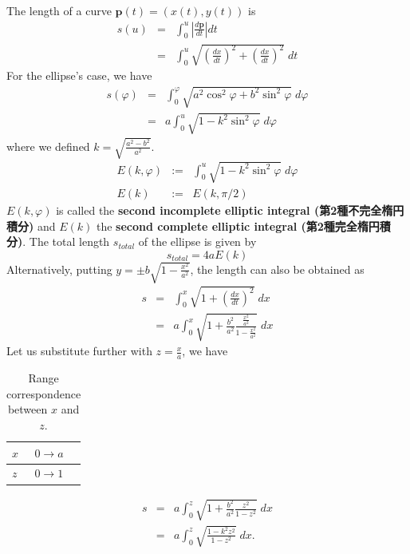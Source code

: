 \documentclass{article}
\begin{document}
The length of a curve $\mathbf{p}(t) = (x(t), y(t))$ is
\begin{eqnarray}
s(u) &=& \int_{0}^{u} \left| \frac{d \mathbf{p}}{d t} \right| dt  \\ \nonumber
     &=& \int_{0}^{u} \sqrt{ \left( \frac{d x}{d t} \right)^{2} +  \left( \frac{d x}{d t} \right)^{2} } \; dt
\end{eqnarray}
For the ellipse's case, we have
\begin{eqnarray}
s(\varphi) &=& \int_{0}^{\varphi} \sqrt{ a^{2} \cos^{2}{\varphi} +  b^{2}  \sin^{2}{\varphi}} \; d\varphi \\ \nonumber
     &=& a \int_{0}^{u} \sqrt{ 1 -  k^{2}  \sin^{2}{\varphi}} \; d\varphi 
\end{eqnarray}
where we defined $k = \sqrt{\frac{a^2 - b^2}{a^2}}$.
\begin{eqnarray}
E(k, \varphi ) &:=& \int_{0}^{u} \sqrt{ 1 -  k^{2}  \sin^{2}{\varphi}} \; d\varphi \\
E(k) &:=& E(k,  \pi/2 )
\end{eqnarray}
$E(k, \varphi )$ is called the \textbf{second incomplete elliptic integral (第2種不完全楕円積分)} and $E(k)$ the \textbf{second complete elliptic integral (第2種完全楕円積分)}. The total length $s_{total}$ of the ellipse is given by 
\begin{equation}
s_{total} = 4a E(k) 
\end{equation}
Alternatively, putting $y = \pm b \sqrt{1 - \frac{x^{2}}{a^{2}}}$, the length can also be obtained as
\begin{eqnarray}
s &=& \int_{0}^{x} \sqrt{ 1  +  \left( \frac{d x}{d t} \right)^{2} } \; dx \\ \nonumber
     &=& a \int_{0}^{x} \sqrt{ 1  +   \frac{b^{2}}{a^{2}} \frac{\frac{x^{2}}{a^{2}}}{1 - \frac{x^{2}}{a^{2}}} } \; dx
\end{eqnarray}
Let us substitute further with $z = \frac{x}{a}$, we have
\begin{table}[htb]
\caption{Range correspondence between $x$ and $z$.}
\centering
\begin{tabular}{ll}
$x$ & $0 \rightarrow a$\\
\hline
$z$ & $0 \rightarrow 1$\\
\end{tabular}
\end{table}

\begin{eqnarray}
s &=& a \int_{0}^{z} \sqrt{ 1  +   \frac{b^{2}}{a^{2}} \frac{z^{2}}{1 - z^{2}} } \; dx \\ \nonumber
  &=& a \int_{0}^{z} \sqrt{ \frac{1 -k ^{2} z^{2}}{1 - z^{2}} } \; dx.
\end{eqnarray}
\end{document}
